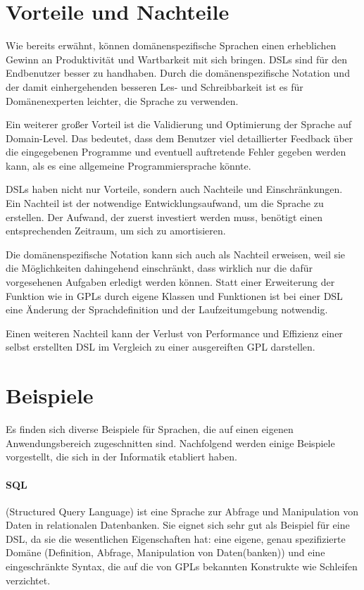 \section{Vorteile und Nachteile}

Wie bereits erwähnt, können domänenspezifische Sprachen einen erheblichen Gewinn an Produktivität und Wartbarkeit mit sich bringen\cite{VaDe98}. DSLs sind für den Endbenutzer besser zu handhaben. Durch die domänenspezifische Notation und der damit einhergehenden besseren Les- und Schreibbarkeit ist es für Domänenexperten leichter, die Sprache zu verwenden. 

Ein weiterer großer Vorteil ist die Validierung und Optimierung der Sprache auf Domain-Level. Das bedeutet, dass dem Benutzer viel detaillierter Feedback über die eingegebenen Programme und eventuell auftretende Fehler gegeben werden kann, als es eine allgemeine Programmiersprache könnte\cite{VaDe00}.

DSLs haben nicht nur Vorteile, sondern auch Nachteile und Einschränkungen. Ein Nachteil ist der not\-wen\-dige Entwicklungsaufwand, um die Sprache zu erstellen. Der Aufwand, der zuerst investiert werden muss, benötigt einen entsprechenden Zeitraum, um sich zu amortisieren.

Die domänenspezifische Notation kann sich auch als Nachteil erweisen, weil sie die Möglichkeiten dahingehend einschränkt, dass wirklich nur die dafür vorgesehenen Aufgaben erledigt werden können. Statt einer Erweiterung der Funktion wie in GPLs durch eigene Klassen und Funktionen ist bei einer DSL eine Änderung der Sprachdefinition und der Laufzeitumgebung not\-wen\-dig.

Einen weiteren Nachteil kann der Verlust von Performance und Effizienz einer selbst erstellten DSL im Vergleich zu einer ausgereiften GPL darstellen\cite{VaDe00}.



\section{Beispiele}
\label{grundlagen_examples}

Es finden sich diverse Beispiele für Sprachen, die auf einen eigenen Anwendungsbereich zugeschnitten sind. Nachfolgend werden einige Beispiele vorgestellt, die sich in der Informatik etabliert haben.

\paragraph*{SQL}
(Structured Query Language) ist eine Sprache zur Abfrage und Manipulation von Daten in relationalen Datenbanken. Sie eignet sich sehr gut als Beispiel für eine DSL, da sie die wesentlichen Eigenschaften hat: eine eigene, genau spezifizierte Domäne (Definition, Abfrage, Manipulation von Daten(banken)) und eine eingeschränkte Syntax, die auf die von GPLs bekannten Konstrukte wie Schleifen verzichtet.

